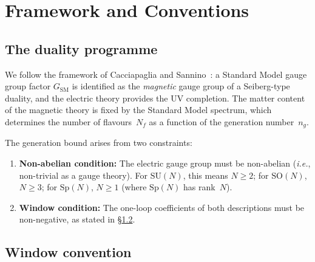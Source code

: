 \documentclass[11pt,a4paper]{article}
\theoremstyle{plain}
\theoremstyle{definition}
\theoremstyle{remark}
\newcommand{\Nf}{N_{\!f}}
\newcommand{\ngen}{n_g}
\newcommand{\SU}[1]{\mathrm{SU}(#1)}
\newcommand{\SO}[1]{\mathrm{SO}(#1)}
\newcommand{\Sp}[1]{\mathrm{Sp}(#1)}
\newcommand{\ie}{\textit{i.e.}}
\newcommand{\SM}{\ensuremath{\mathrm{SM}}}
\begin{document}
\section{Framework and Conventions}
\label{sec:framework}

\subsection{The duality programme}

We follow the framework of Cacciapaglia and
Sannino~\cite{CacciapagliaSannino2024}: a Standard Model gauge group
factor $G_{\SM}$ is identified as the \emph{magnetic} gauge group of a
Seiberg-type duality, and the electric theory provides the UV completion.
The matter content of the magnetic theory is fixed by the Standard Model
spectrum, which determines the number of flavours~$\Nf$ as a function
of the generation number~$\ngen$.

The generation bound arises from two constraints:
\begin{enumerate}
  \item \textbf{Non-abelian condition:} The electric gauge group must be
    non-abelian (\ie, non-trivial as a gauge theory).  For $\SU{N}$,
    this means $N \geq 2$; for $\SO{N}$, $N \geq 3$; for $\Sp{N}$,
    $N \geq 1$ (where $\Sp{N}$ has rank~$N$).
  \item \textbf{Window condition:} The one-loop coefficients of both
    descriptions must be non-negative, as stated in
    \S\ref{ssec:convention}.
\end{enumerate}

\subsection{Window convention}
\label{ssec:convention}
\end{document}
